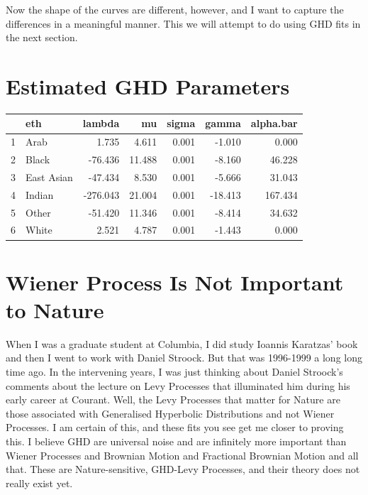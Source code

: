 \documentclass{amsart}
\begin{document}
Now the shape of the curves are different, however, and I want to capture the differences in a meaningful manner.  This we will attempt to do using GHD fits in the next section.

\section{Estimated GHD Parameters}

\begin{table}[ht]
\centering
\begin{tabular}{rlrrrrr}
  \hline
 & eth & lambda & mu & sigma & gamma & alpha.bar \\ 
  \hline
1 & Arab & 1.735 & 4.611 & 0.001 & -1.010 & 0.000 \\ 
  2 & Black & -76.436 & 11.488 & 0.001 & -8.160 & 46.228 \\ 
  3 & East Asian & -47.434 & 8.530 & 0.001 & -5.666 & 31.043 \\ 
  4 & Indian & -276.043 & 21.004 & 0.001 & -18.413 & 167.434 \\ 
  5 & Other & -51.420 & 11.346 & 0.001 & -8.414 & 34.632 \\ 
  6 & White & 2.521 & 4.787 & 0.001 & -1.443 & 0.000 \\ 
   \hline
\end{tabular}
\end{table}


\section{Wiener Process Is Not Important to Nature}

When I was a graduate student at Columbia, I did study Ioannis Karatzas' book and then I went to work with Daniel Stroock.  But that was 1996-1999 a long long time ago.  In the intervening years, I was just thinking about Daniel Stroock's comments about the lecture on Levy Processes that illuminated him during his early career at Courant.  Well, the Levy Processes that matter for Nature are those associated with Generalised Hyperbolic Distributions and not Wiener Processes.  I am certain of this, and these fits you see get me closer to proving this.  I believe GHD are universal noise and are infinitely more important than Wiener Processes and Brownian Motion and Fractional Brownian Motion and all that.  These are Nature-sensitive, GHD-Levy Processes, and their theory does not really exist yet.  
\end{document}
